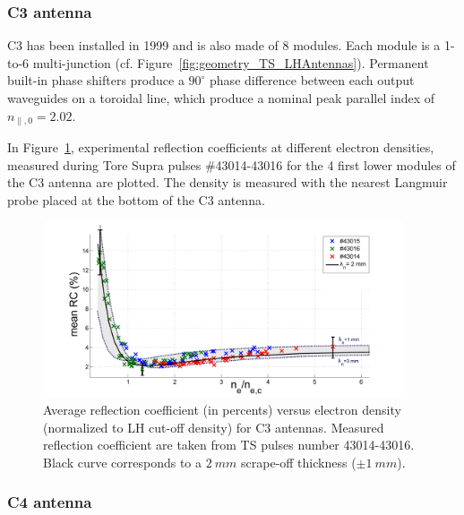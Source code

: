 \subsubsection{C3 antenna}
C3 has been installed in 1999 and is also made of 8 modules. Each module is a 1-to-6 multi-junction (cf. Figure~\ref{fig:geometry_TS_LHAntennas}). Permanent built-in phase shifters produce a $90^\circ$ phase difference between each output waveguides on a toroidal line, which produce a nominal peak parallel index of $n_{\parallel,0}=2.02$.

In Figure~\ref{fig:MarkII_mean_RC}, experimental reflection coefficients at different electron densities, measured during Tore Supra pulses \#43014-43016 for the 4 first lower modules of the C3 antenna are plotted. The density is measured with the nearest Langmuir probe placed at the bottom of the C3 antenna. 

\begin{figure}[h]
	\centering
	\includegraphics[width=0.95\textwidth]{figures/chap2/Tore_Supra/C3_mean_lowerMod}
	\caption{Average reflection  coefficient (in percents) versus electron density (normalized to LH cut-off density) for C3 antennas. Measured reflection  coefficient are taken from TS pulses number 43014-43016. Black curve corresponds to a $2~mm$ scrape-off thickness ($\pm 1~mm$).}
	\label{fig:MarkII_mean_RC}
\end{figure}




\subsubsection{C4 antenna}

